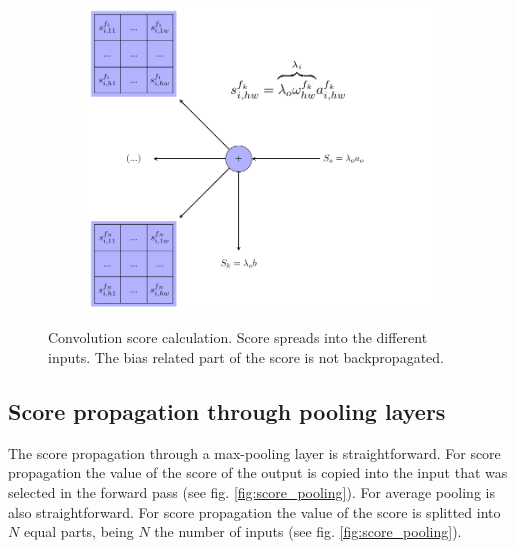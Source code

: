 \documentclass[preprint]{elsarticle}
\theoremstyle{definition} %
\theoremstyle{remark}
\begin{document}
\begin{figure}[h!]
\begin{subfigure}{0.4\textwidth}
		\includegraphics[scale=0.4]{figures/score_conv2d-score.pdf}
	\end{subfigure}
	\caption{Convolution score calculation. Score spreads into the different inputs. The bias related part of the score is not backpropagated.}
	\label{fig:convolution_score}
\end{figure}

\subsection{Score propagation through pooling layers}

The score propagation through a max-pooling layer is straightforward. For score propagation the value of the score of the output is copied into the input that was selected in the forward pass (see fig. \ref{fig:score_pooling}). For average pooling is also straightforward. For score propagation the value of the score is splitted into $N$ equal parts, being $N$ the number of inputs (see fig. \ref{fig:score_pooling}).
\end{document}
